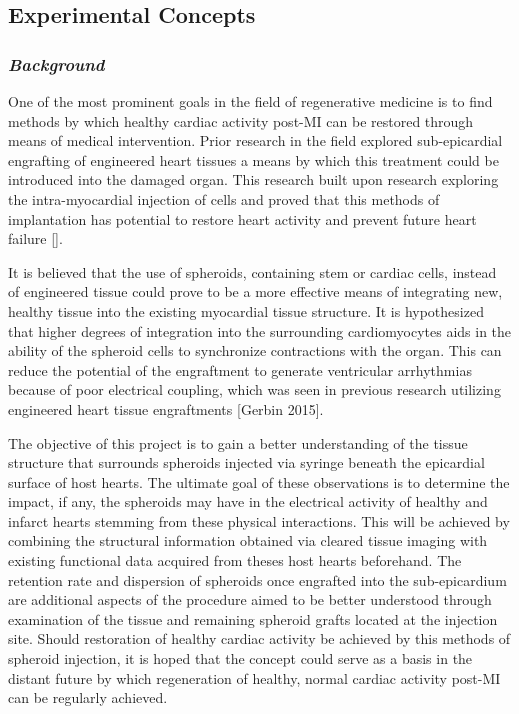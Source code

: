 \subsection{Experimental Concepts}
\subsubsection{\textit{Background}}
One of the most prominent goals in the field of regenerative medicine is to find methods by which healthy cardiac activity post-MI can be restored through means of medical intervention. Prior research in the field explored sub-epicardial engrafting of engineered heart tissues a means by which this treatment could be introduced into the damaged organ. This research built upon research exploring the intra-myocardial injection of cells and proved that this methods of implantation has potential to restore heart activity and prevent future heart failure []. 

It is believed that the use of spheroids, containing stem or cardiac cells, instead of engineered tissue could prove to be a more effective means of integrating new, healthy tissue into the existing myocardial tissue structure. It is hypothesized that higher degrees of integration into the surrounding cardiomyocytes aids in the ability of the spheroid cells to synchronize contractions with the organ. This can reduce the potential of the engraftment to generate ventricular arrhythmias because of poor electrical coupling, which was seen in previous research utilizing engineered heart tissue engraftments [Gerbin 2015].

The objective of this project is to gain a better understanding of the tissue structure that surrounds spheroids injected via syringe beneath the epicardial surface of host hearts. The ultimate goal of these observations is to determine the impact, if any, the spheroids may have in the electrical activity of healthy and infarct hearts stemming from these physical interactions.  This will be achieved by combining the structural information obtained via cleared tissue imaging with existing functional data acquired from theses host hearts beforehand. The retention rate and dispersion of spheroids once engrafted into the sub-epicardium are additional aspects of the procedure aimed to be better understood through examination of the tissue and remaining spheroid grafts located at the injection site. Should restoration of healthy cardiac activity be achieved by this methods of spheroid injection, it is hoped that the concept could serve as a basis in the distant future by which regeneration of healthy, normal cardiac activity post-MI can be regularly achieved.  



